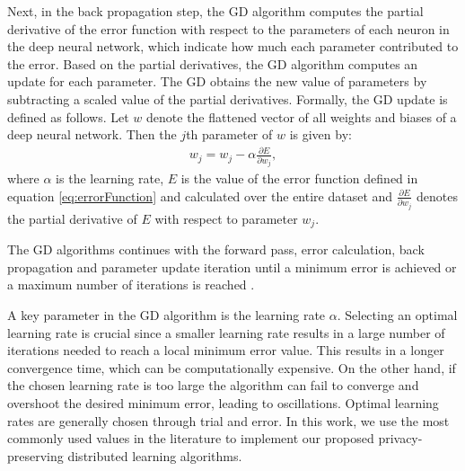 \documentclass[conference]{IEEEtran}
\begin{document}
Next, in the back propagation step, the GD algorithm 
computes the partial derivative of the error function with respect to the
parameters of each neuron in the deep neural network, which indicate how much each parameter contributed to
the error. Based on the partial derivatives, the GD algorithm computes an update for each parameter. 
The GD  obtains the new value of parameters by subtracting a scaled value of the partial derivatives. Formally, the GD update is
defined as follows.  Let $w$ denote the flattened vector of all weights and biases of a deep neural
network. Then the $j$th parameter of $w$ is given by:
\begin{align}\label{eq:GD}
w_j = w_j -\alpha \frac{\partial E}{\partial w_j}, 
\end{align}
where $\alpha$ is the learning rate,  $E$ is the value of the error function defined in equation \eqref{eq:errorFunction} and calculated over the entire dataset and $\frac{\partial E}{\partial w_j}$ denotes the partial derivative of $E$ with respect to
parameter $w_j$.

The GD algorithms continues with the forward pass, error calculation, back propagation and parameter update iteration until a minimum
error is achieved or a maximum number of iterations is reached \cite{ruder2016overview}. 

A key parameter in the GD algorithm is the learning rate $\alpha$.   Selecting an optimal learning
rate is crucial since a smaller learning rate results in a large number of iterations needed to reach a local minimum error value. This
results in a longer convergence time, which can be computationally expensive. On the other hand, if the chosen learning rate is too
large the algorithm can fail to converge and overshoot the desired minimum error, leading to oscillations.  Optimal learning rates are
generally chosen through trial and error. In this work, we use the most commonly used values in the literature to implement our
proposed privacy-preserving distributed learning algorithms. 
\end{document}
